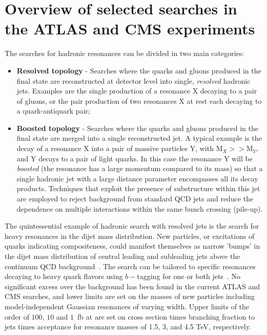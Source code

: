 \documentclass{PoS}
\begin{document}
\section{Overview of selected searches in the ATLAS and CMS experiments}

The searches for hadronic resonances can be divided in two main categories:
\begin{itemize}
 \item {\bf Resolved topology} - Searches where the quarks and gluons produced in the final state are reconstructed at detector level into single,  \textit{resolved} hadronic jets. Examples are the single production of a resonance X decaying to a pair of gluons, or the pair production of two resonances X at rest each decaying to a quark-antiquark pair;
 \item {\bf Boosted topology} - Searches where the quarks and gluons produced in the final state are merged into a single reconstructed jet.  A typical example is the decay of a resonance X into a pair of massive particles Y, with $\mbox{M}_{X} >>\mbox{M}_{Y} $, and Y decays to a pair of light quarks. In this case the resonance Y will be \textit{boosted} 
(the resonance has a large momentum compared to its mass) so that a single hadronic jet with a large distance 
parameter encompasses all its decay products. Techniques that exploit the presence of substructure within this jet are employed to reject background from standard QCD jets and reduce the dependence on multiple interactions within the same bunch crossing (pile-up). 
\end{itemize}

The quintessential example of hadronic search with resolved jets is the 
search for heavy resonances in the dijet mass distribution. New particles, 
or excitations of quarks indicating 
compositeness,
could manifest 
themselves as narrow 'bumps' in the dijet mass distribution of central leading
and subleading jets above the continuum QCD background~\cite{CMS-PAS-EXO-12-059, ATLAS-CONF-2012-148}. 
The search can be tailored to specific resonances
decaying to heavy quark flavors using $b-$tagging for one or both jets~\cite{CMS-PAS-EXO-12-023}. 
No significant excess over the background has been found in the current ATLAS and CMS searches,
and lower limits are set on the masses of new particles 
including model-independent Gaussian resonances of varying width.
Upper limits of the order of $100$, $10$ and $1$~fb at are set on cross section times branching fraction to jets times acceptance 
for resonance masses of 1.5, 3, and 4.5 TeV, respectively.
\end{document}
